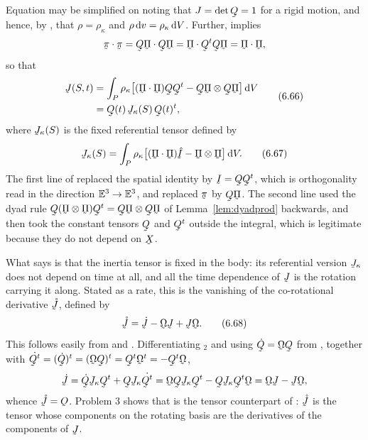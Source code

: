 Equation  may be simplified on noting that $J=\det\bQ=1$ for
a rigid motion, and hence, by , that $\rho=\rho_{\kappa}$ and
$\rho\,\mathrm{d} v=\rho_{\kappa}\,\mathrm{d} V$. Further,  implies
\[
   \ip{\vek\pi}{\vek\pi}=\ip{\bQ\vek\Pi}{\bQ\vek\Pi}
   =\ip{\vek\Pi}{\bQ^{t}\bQ\vek\Pi}=\ip{\vek\Pi}{\vek\Pi},
\]
so that
\begin{equation}
\begin{aligned}
   \vek{J}(S,t)
   &=\int_{P}\rho_{\kappa}\big[(\ip{\vek\Pi}{\vek\Pi})\bQ\bQ^{t}
     -\bQ\vek\Pi\otimes\bQ\vek\Pi\big]\,\dl V\\
   &=\bQ(t)\,\vek{J}_{\kappa}(S)\,\bQ(t)^{t},
\end{aligned}
   \tag{6.66}\label{eq:6.66}
\end{equation}
where $\vek{J}_{\kappa}(S)$ is the fixed referential tensor defined by
\begin{equation}
   \vek{J}_{\kappa}(S)=\int_{P}\rho_{\kappa}
   \big[(\ip{\vek\Pi}{\vek\Pi})\hI-\vek\Pi\otimes\vek\Pi\big]\,\dl V .
   \tag{6.67}\label{eq:6.67}
\end{equation}
The first line of  replaced the spatial identity by
$\I=\bQ\bQ^{t}$, which is orthogonality read in the direction
$\mathbb{E}^{3}\to\mathbb{E}^{3}$, and replaced $\vek\pi$ by $\bQ\vek\Pi$. The second line
used the dyad rule $\bQ(\vek\Pi\otimes\vek\Pi)\bQ^{t}
=\bQ\vek\Pi\otimes\bQ\vek\Pi$ of Lemma~\ref{lem:dyadprod} backwards,
and then took the constant tensors $\bQ$ and $\bQ^{t}$ outside the
integral, which is legitimate because they do not depend on $\bX$.

What  says is that the inertia tensor is fixed in the body:
its referential version $\vek{J}_{\kappa}$ does not depend on time at
all, and all the time dependence of $\vek{J}$ is the rotation carrying
it along. Stated as a rate, this is the vanishing of the co-rotational
derivative $\mathring{\vek{J}}$, defined by
\begin{equation}
   \mathring{\vek{J}}=\dot{\vek{J}}-\bOm\vek{J}+\vek{J}\bOm .
   \tag{6.68}\label{eq:6.68}
\end{equation}
This follows easily from  and . Differentiating
$_{2}$ and using $\dot\bQ=\bOm\bQ$ from ,
together with $\dot{\bQ^{t}}=(\dot\bQ)^{t}=(\bOm\bQ)^{t}
=\bQ^{t}\bOm^{t}=-\bQ^{t}\bOm$,
\[
   \dot{\vek{J}}=\dot\bQ\vek{J}_{\kappa}\bQ^{t}
   +\bQ\vek{J}_{\kappa}\dot{\bQ^{t}}
   =\bOm\bQ\vek{J}_{\kappa}\bQ^{t}-\bQ\vek{J}_{\kappa}\bQ^{t}\bOm
   =\bOm\vek{J}-\vek{J}\bOm ,
\]
whence $\mathring{\vek{J}}=\Ob$. Problem 3 shows that  is the
tensor counterpart of : $\mathring{\vek{J}}$ is the tensor
whose components on the rotating basis are the derivatives of the
components of $\vek{J}$.

